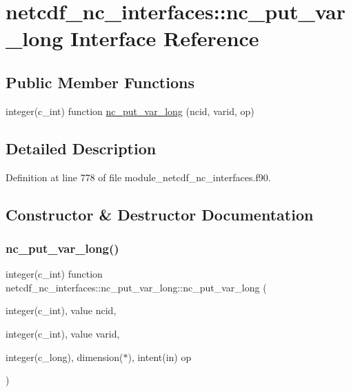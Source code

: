 \hypertarget{interfacenetcdf__nc__interfaces_1_1nc__put__var__long}{}\section{netcdf\+\_\+nc\+\_\+interfaces\+:\+:nc\+\_\+put\+\_\+var\+\_\+long Interface Reference}
\label{interfacenetcdf__nc__interfaces_1_1nc__put__var__long}
\subsection*{Public Member Functions}
\begin{DoxyCompactItemize}
\item 
integer(c\+\_\+int) function \hyperlink{interfacenetcdf__nc__interfaces_1_1nc__put__var__long_a0d3881a41bcbed966563eba2b1969f74}{nc\+\_\+put\+\_\+var\+\_\+long} (ncid, varid, op)
\end{DoxyCompactItemize}


\subsection{Detailed Description}


Definition at line 778 of file module\+\_\+netcdf\+\_\+nc\+\_\+interfaces.\+f90.



\subsection{Constructor \& Destructor Documentation}
\mbox{\label{interfacenetcdf__nc__interfaces_1_1nc__put__var__long_a0d3881a41bcbed966563eba2b1969f74}} 
\subsubsection{\texorpdfstring{nc\+\_\+put\+\_\+var\+\_\+long()}{nc\_put\_var\_long()}}
{\footnotesize\ttfamily integer(c\+\_\+int) function netcdf\+\_\+nc\+\_\+interfaces\+::nc\+\_\+put\+\_\+var\+\_\+long\+::nc\+\_\+put\+\_\+var\+\_\+long (\begin{DoxyParamCaption}\item[{integer(c\+\_\+int), value}]{ncid,  }\item[{integer(c\+\_\+int), value}]{varid,  }\item[{integer(c\+\_\+long), dimension($\ast$), intent(in)}]{op }\end{DoxyParamCaption})}



